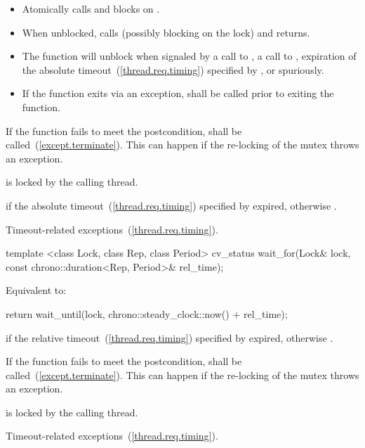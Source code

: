 \begin{itemdescr}
\pnum\effects

\begin{itemize}
\item
Atomically calls  and blocks on .

\item
When unblocked, calls  (possibly blocking on the lock) and returns.

\item
The function will unblock when signaled by a call to , a call to ,
expiration of the absolute timeout~(\ref{thread.req.timing}) specified by ,
or spuriously.

\item
If the function exits via an exception,  shall be called prior to exiting the function.
\end{itemize}

\pnum
\notes
If the function fails to meet the postcondition, 
shall be called~(\ref{except.terminate}).
\enternote This can happen if the re-locking of the mutex throws an exception. \exitnote

\pnum
\postcondition {} is locked by the calling thread.

\pnum
\returns {} if
the absolute timeout~(\ref{thread.req.timing}) specified by  expired,
otherwise .

\pnum
\throws Timeout-related
exceptions~(\ref{thread.req.timing}).

\end{itemdescr}

%
%
\begin{itemdecl}
template <class Lock, class Rep, class Period>
  cv_status wait_for(Lock& lock, const chrono::duration<Rep, Period>& rel_time);
\end{itemdecl}

\begin{itemdescr}
\pnum
\effects Equivalent to:

\begin{codeblock}
return wait_until(lock, chrono::steady_clock::now() + rel_time);
\end{codeblock}

\pnum
\returns {} if
the relative timeout~(\ref{thread.req.timing}) specified by  expired,
otherwise .

\pnum
\notes
If the function fails to meet the postcondition, 
shall be called~(\ref{except.terminate}).
\enternote This can happen if the re-locking of the mutex throws an exception. \exitnote

\pnum
\postcondition {} is locked by the calling thread.

\pnum
\throws Timeout-related
exceptions~(\ref{thread.req.timing}).

\end{itemdescr}

